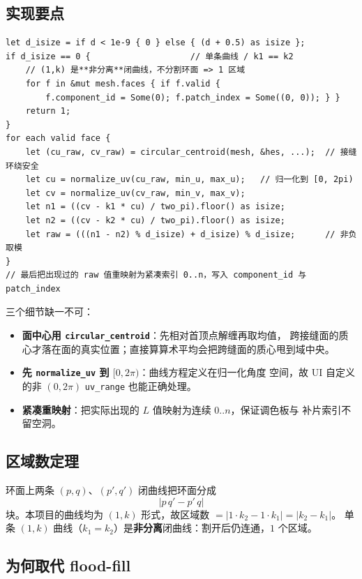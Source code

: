 \documentclass{article}
\begin{document}
\subsection*{实现要点}

\begin{lstlisting}[]
let d_isize = if d < 1e-9 { 0 } else { (d + 0.5) as isize };
if d_isize == 0 {                    // 单条曲线 / k1 == k2
    // (1,k) 是**非分离**闭曲线，不分割环面 => 1 区域
    for f in &mut mesh.faces { if f.valid {
        f.component_id = Some(0); f.patch_index = Some((0, 0)); } }
    return 1;
}
for each valid face {
    let (cu_raw, cv_raw) = circular_centroid(mesh, &hes, ...);  // 接缝环绕安全
    let cu = normalize_uv(cu_raw, min_u, max_u);   // 归一化到 [0, 2pi)
    let cv = normalize_uv(cv_raw, min_v, max_v);
    let n1 = ((cv - k1 * cu) / two_pi).floor() as isize;
    let n2 = ((cv - k2 * cu) / two_pi).floor() as isize;
    let raw = (((n1 - n2) % d_isize) + d_isize) % d_isize;      // 非负取模
}
// 最后把出现过的 raw 值重映射为紧凑索引 0..n，写入 component_id 与 patch_index
\end{lstlisting}

三个细节缺一不可：
\begin{itemize}
\item \textbf{面中心用 \texttt{circular\_centroid}}：先相对首顶点解缠再取均值，
  跨接缝面的质心才落在面的真实位置；直接算算术平均会把跨缝面的质心甩到域中央。
\item \textbf{先 \texttt{normalize\_uv} 到 $[0,2\pi)$}：曲线方程定义在归一化角度
  空间，故 UI 自定义的非 $(0,2\pi)$ \texttt{uv\_range} 也能正确处理。
\item \textbf{紧凑重映射}：把实际出现的 $L$ 值映射为连续 $0..n$，保证调色板与
  补片索引不留空洞。
\end{itemize}

\subsection*{区域数定理}

环面上两条 $(p,q)$、$(p',q')$ 闭曲线把环面分成
\[
|p\,q' - p'\,q|
\]
块。本项目的曲线均为 $(1,k)$ 形式，故区域数 $=|1\cdot k_2-1\cdot k_1|=|k_2-k_1|$。
单条 $(1,k)$ 曲线（$k_1=k_2$）是\textbf{非分离}闭曲线：割开后仍连通，$1$ 个区域。

\subsection*{为何取代 flood-fill}
\end{document}
